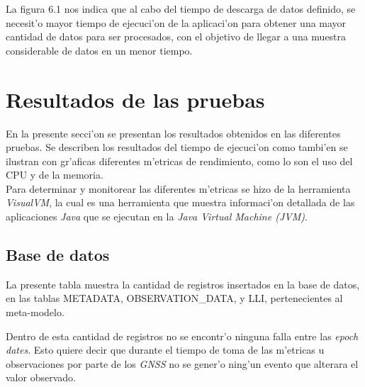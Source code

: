 La figura 6.1 nos indica que al cabo del tiempo de descarga de datos definido, se necesit'o mayor tiempo de ejecuci'on de la aplicaci'on para obtener una mayor cantidad de datos para ser procesados, con el objetivo de llegar a una muestra considerable de datos en un menor tiempo.

\section{Resultados de las pruebas}
\noindent
En la presente secci'on se presentan los resultados obtenidos en las diferentes pruebas. Se describen los resultados del tiempo de ejecuci'on como tambi'en se ilustran con gr'aficas diferentes m'etricas de rendimiento, como lo son el uso del CPU y de la memoria. \\

Para determinar y monitorear las diferentes m'etricas se hizo de la herramienta \emph{VisualVM}, la cual es una herramienta que muestra informaci'on detallada de las aplicaciones \emph{Java} que se ejecutan en la \emph{Java Virtual Machine (JVM)}. \\

\subsection{Base de datos}
\noindent
La presente tabla muestra la cantidad de registros insertados en la base de datos, en las tablas METADATA, OBSERVATION\_DATA, y LLI, pertenecientes al meta-modelo.

\begin{table}[H]
\begin{center}
\end{center}
\caption{Distribuci'on de registros en las tablas del meta-modelo}
\end{table}

Dentro de esta cantidad de registros no se encontr'o ninguna falla entre las \emph{epoch dates}. Esto quiere decir que durante el tiempo de toma de las m'etricas u observaciones por parte de los \emph{GNSS} no se gener'o ning'un evento que alterara el valor observado. \\

